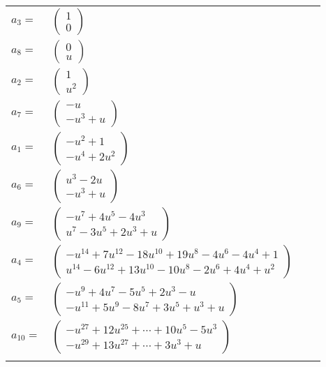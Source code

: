 \documentclass[1p]{elsarticle_modified}
\theoremstyle{definition}
\begin{document}
\begin{tabular}{m{7pt} m{180pt} m{7pt} m{180pt} }
\flushright $a_{3}=$&$\begin{pmatrix}1\\0\end{pmatrix}$ \\
\flushright $a_{8}=$&$\begin{pmatrix}0\\u\end{pmatrix}$ \\
\flushright $a_{2}=$&$\begin{pmatrix}1\\u^2\end{pmatrix}$ \\
\flushright $a_{7}=$&$\begin{pmatrix}- u\\- u^3+u\end{pmatrix}$ \\
\flushright $a_{1}=$&$\begin{pmatrix}- u^2+1\\- u^4+2 u^2\end{pmatrix}$ \\
\flushright $a_{6}=$&$\begin{pmatrix}u^3-2 u\\- u^3+u\end{pmatrix}$ \\
\flushright $a_{9}=$&$\begin{pmatrix}- u^7+4 u^5-4 u^3\\u^7-3 u^5+2 u^3+u\end{pmatrix}$ \\
\flushright $a_{4}=$&$\begin{pmatrix}- u^{14}+7 u^{12}-18 u^{10}+19 u^8-4 u^6-4 u^4+1\\u^{14}-6 u^{12}+13 u^{10}-10 u^8-2 u^6+4 u^4+u^2\end{pmatrix}$ \\
\flushright $a_{5}=$&$\begin{pmatrix}- u^9+4 u^7-5 u^5+2 u^3- u\\- u^{11}+5 u^9-8 u^7+3 u^5+u^3+u\end{pmatrix}$ \\
\flushright $a_{10}=$&$\begin{pmatrix}- u^{27}+12 u^{25}+\cdots+10 u^5-5 u^3\\- u^{29}+13 u^{27}+\cdots+3 u^3+u\end{pmatrix}$\\&\end{tabular}
\end{document}
